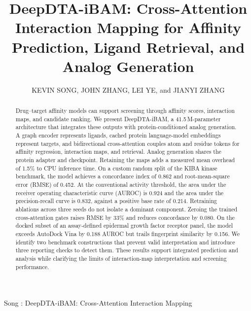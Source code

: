 \documentclass{ieeeaccess}
\begin{document}
\history{}
\doi{}
\vol{}
\year{}

\title{DeepDTA-iBAM: Cross-Attention Interaction Mapping for Affinity Prediction, Ligand Retrieval, and Analog Generation}

\author{\uppercase{Kevin Song},
\uppercase{John Zhang},
\uppercase{Lei Ye}, and
\uppercase{Jianyi Zhang}}
\address[1]{Department of Biomedical Engineering, The University of Alabama
at Birmingham, Birmingham, AL 35294 USA}

%
{Song \headeretal: DeepDTA-iBAM: Cross-Attention Interaction Mapping}

\begin{abstract}
Drug--target affinity models can support screening through affinity scores,
interaction maps, and candidate ranking. We present DeepDTA-iBAM, a
41.5\,M-parameter architecture that integrates these outputs with
protein-conditioned analog generation. A graph encoder represents ligands,
cached protein language-model embeddings represent targets, and bidirectional
cross-attention couples atom and residue tokens for affinity regression,
interaction maps, and retrieval. Analog generation shares the protein adapter
and checkpoint. Retaining the maps adds a measured mean overhead of 1.5\% to
CPU inference time. On a custom random split of the KIBA kinase benchmark, the model achieves a
concordance index of 0.862 and root-mean-square error (RMSE) of 0.452.
At the conventional activity threshold, the area under the receiver operating
characteristic curve (AUROC) is 0.924 and the area under the precision-recall
curve is 0.832, against a positive base rate of 0.214.
Retraining ablations across three seeds do not isolate a dominant component.
Zeroing the trained cross-attention gates raises RMSE by 33\% and reduces
concordance by 0.080. On the docked subset of an assay-defined epidermal growth
factor receptor panel, the model exceeds AutoDock Vina by 0.188 AUROC but trails
fingerprint similarity by 0.156. We identify two benchmark constructions that
prevent valid interpretation and introduce three reporting checks to detect
them. These results support integrated prediction and analysis while
clarifying the limits of interaction-map interpretation and screening performance.
\end{abstract}
\end{document}
